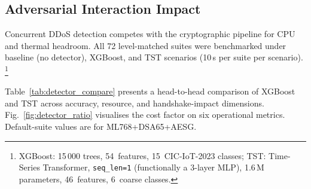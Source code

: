 \subsection{Adversarial Interaction Impact}
\label{sec:ddos}

Concurrent DDoS detection competes with the cryptographic pipeline
for CPU and thermal headroom.  All 72 level-matched suites were
benchmarked under baseline (no detector), XGBoost, and TST scenarios
(10\,s per suite per scenario).%
\footnote{XGBoost: 15\,000 trees, 54~features, 15~CIC-IoT-2023
  classes; TST: Time-Series Transformer, \texttt{seq\_len=1}
  (functionally a 3-layer MLP), 1.6\,M parameters, 46~features,
  6~coarse classes.}

Table~\ref{tab:detector_compare} presents a head-to-head comparison
of XGBoost and TST across accuracy, resource, and handshake-impact
dimensions.  Fig.~\ref{fig:detector_ratio} visualises the cost
factor on six operational metrics.  Default-suite values are for
ML768+DSA65+AESG.

